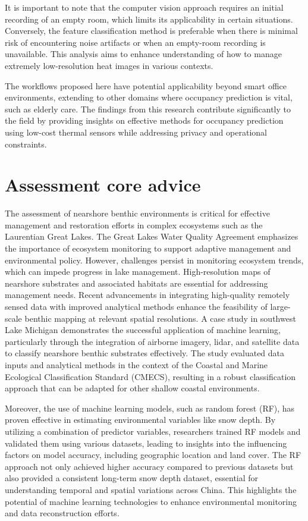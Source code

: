 \documentclass[runningheads]{llncs}
\begin{document}
It is important to note that the computer vision approach requires an initial recording of an empty room, which limits its applicability in certain situations. Conversely, the feature classification method is preferable when there is minimal risk of encountering noise artifacts or when an empty-room recording is unavailable. This analysis aims to enhance understanding of how to manage extremely low-resolution heat images in various contexts.

The workflows proposed here have potential applicability beyond smart office environments, extending to other domains where occupancy prediction is vital, such as elderly care. The findings from this research contribute significantly to the field by providing insights on effective methods for occupancy prediction using low-cost thermal sensors while addressing privacy and operational constraints.
\section{Assessment core advice}
The assessment of nearshore benthic environments is critical for effective management and restoration efforts in complex ecosystems such as the Laurentian Great Lakes. The Great Lakes Water Quality Agreement emphasizes the importance of ecosystem monitoring to support adaptive management and environmental policy. However, challenges persist in monitoring ecosystem trends, which can impede progress in lake management. High-resolution maps of nearshore substrates and associated habitats are essential for addressing management needs. Recent advancements in integrating high-quality remotely sensed data with improved analytical methods enhance the feasibility of large-scale benthic mapping at relevant spatial resolutions. A case study in southwest Lake Michigan demonstrates the successful application of machine learning, particularly through the integration of airborne imagery, lidar, and satellite data to classify nearshore benthic substrates effectively. The study evaluated data inputs and analytical methods in the context of the Coastal and Marine Ecological Classification Standard (CMECS), resulting in a robust classification approach that can be adapted for other shallow coastal environments.

Moreover, the use of machine learning models, such as random forest (RF), has proven effective in estimating environmental variables like snow depth. By utilizing a combination of predictor variables, researchers trained RF models and validated them using various datasets, leading to insights into the influencing factors on model accuracy, including geographic location and land cover. The RF approach not only achieved higher accuracy compared to previous datasets but also provided a consistent long-term snow depth dataset, essential for understanding temporal and spatial variations across China. This highlights the potential of machine learning technologies to enhance environmental monitoring and data reconstruction efforts.
\end{document}
